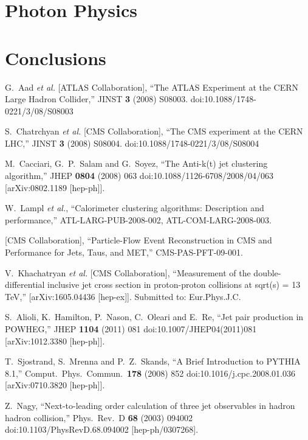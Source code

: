 \documentclass{PoS}
\begin{document}
\section{Photon Physics}

\section{Conclusions}

\begin{thebibliography}{99}

  G.~Aad {\it et al.} [ATLAS Collaboration],
  ``The ATLAS Experiment at the CERN Large Hadron Collider,''
  JINST {\bf 3} (2008) S08003.
  doi:10.1088/1748-0221/3/08/S08003

  S.~Chatrchyan {\it et al.} [CMS Collaboration],
  ``The CMS experiment at the CERN LHC,''
  JINST {\bf 3} (2008) S08004.
  doi:10.1088/1748-0221/3/08/S08004

  M.~Cacciari, G.~P.~Salam and G.~Soyez,
  ``The Anti-k(t) jet clustering algorithm,''
  JHEP {\bf 0804} (2008) 063
  doi:10.1088/1126-6708/2008/04/063
  [arXiv:0802.1189 [hep-ph]].

  W.~Lampl {\it et al.}, 
   ``Calorimeter clustering algorithms: Description and performance,''
  ATL-LARG-PUB-2008-002, ATL-COM-LARG-2008-003.

  [CMS Collaboration],
  ``Particle-Flow Event Reconstruction in CMS and Performance for Jets, Taus, and MET,''
  CMS-PAS-PFT-09-001.

  V.~Khachatryan {\it et al.} [CMS Collaboration], 
   ``Measurement of the double-differential inclusive jet cross section in proton-proton collisions at sqrt(s) = 13 TeV,'' 
  [arXiv:1605.04436 [hep-ex]]. 
   Submitted to: Eur.Phys.J.C.

  S.~Alioli, K.~Hamilton, P.~Nason, C.~Oleari and E.~Re,
  ``Jet pair production in POWHEG,''
  JHEP {\bf 1104} (2011) 081
  doi:10.1007/JHEP04(2011)081
  [arXiv:1012.3380 [hep-ph]].

  T.~Sjostrand, S.~Mrenna and P.~Z.~Skands,
  ``A Brief Introduction to PYTHIA 8.1,''
  Comput.\ Phys.\ Commun.\  {\bf 178} (2008) 852
  doi:10.1016/j.cpc.2008.01.036
  [arXiv:0710.3820 [hep-ph]].

  Z.~Nagy,
  ``Next-to-leading order calculation of three jet observables in hadron hadron collision,''
  Phys.\ Rev.\ D {\bf 68} (2003) 094002
  doi:10.1103/PhysRevD.68.094002
  [hep-ph/0307268].


\end{thebibliography}
\end{document}
